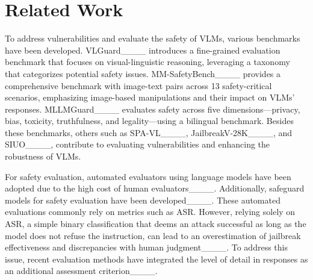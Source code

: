 \section{Related Work}

To address vulnerabilities and evaluate the safety of VLMs, various benchmarks have been developed. VLGuard____ introduces a fine-grained evaluation benchmark that focuses on visual-linguistic reasoning, leveraging a taxonomy that categorizes potential safety issues. MM-SafetyBench____ provides a comprehensive benchmark with image-text pairs across 13 safety-critical scenarios, emphasizing image-based manipulations and their impact on VLMs' responses. MLLMGuard____ evaluates safety across five dimensions—privacy, bias, toxicity, truthfulness, and legality—using a bilingual benchmark. Besides these benchmarks, others such as SPA-VL____, JailbreakV-28K____, and SIUO____, contribute to evaluating vulnerabilities and enhancing the robustness of VLMs.

For safety evaluation, automated evaluators using language models have been adopted due to the high cost of human evaluators____. Additionally, safeguard models for safety evaluation have been developed____. These automated evaluations commonly rely on metrics such as ASR. However, relying solely on ASR, a simple binary classification that deems an attack successful as long as the model does not refuse the instruction, can lead to an overestimation of jailbreak effectiveness and discrepancies with human judgment____. To address this issue, recent evaluation methods have integrated the level of detail in responses as an additional assessment criterion____.